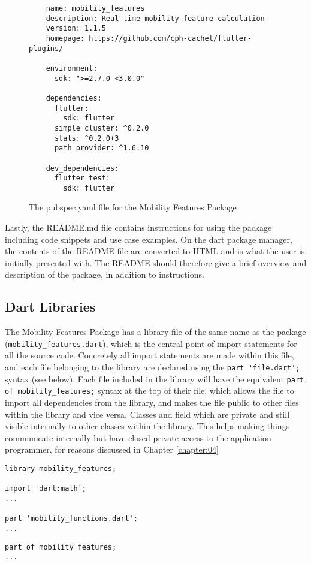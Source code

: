 \begin{figure}
    \centering
    \begin{verbatim}
    name: mobility_features
    description: Real-time mobility feature calculation
    version: 1.1.5
    homepage: https://github.com/cph-cachet/flutter-plugins/
    
    environment:
      sdk: ">=2.7.0 <3.0.0"
    
    dependencies:
      flutter:
        sdk: flutter
      simple_cluster: ^0.2.0
      stats: ^0.2.0+3
      path_provider: ^1.6.10
    
    dev_dependencies:
      flutter_test:
        sdk: flutter
    \end{verbatim}
    \caption{The pubspec.yaml file for the Mobility Features Package}
    \label{fig:pubspec}
\end{figure}

Lastly, the README.md file contains instructions for using the package including code snippets and use case examples. On the dart package manager, the contents of the README file are converted to HTML and is what the user is initially presented with. The README should therefore give a brief overview and description of the package, in addition to instructions.

\subsection{Dart Libraries}
The Mobility Features Package has a library file of the same name as the package (\verb|mobility_features.dart|), which is the central point of import statements for all the source code. Concretely all import statements are made within this file, and each file belonging to the library are declared using the \verb|part 'file.dart';| syntax (see below). Each file included in the library will have the equivalent \verb|part of mobility_features;| syntax at the top of their file, which allows the file to import all dependencies from the library, and makes the file public to other files within the library and vice versa. Classes and field which are private and still visible internally to other classes within the library. This helps making things communicate internally but have closed private access to the application programmer, for reasons discussed in Chapter \ref{chapter:04}

\begin{verbatim}
library mobility_features;

import 'dart:math';
...

part 'mobility_functions.dart';
...
\end{verbatim}

\begin{verbatim}
part of mobility_features;
...
\end{verbatim}
